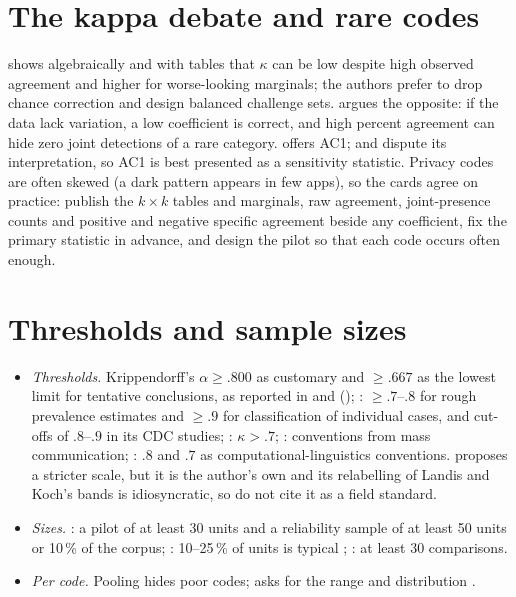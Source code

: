 \section{The kappa debate and rare codes}
 shows algebraically and with tables that $\kappa$ can be low despite high observed agreement and higher for worse-looking marginals; the authors prefer to drop chance correction and design balanced challenge sets.  argues the opposite: if the data lack variation, a low coefficient is correct, and high percent agreement can hide zero joint detections of a rare category.  offers AC1;  and  dispute its interpretation, so AC1 is best presented as a sensitivity statistic. Privacy codes are often skewed (a dark pattern appears in few apps), so the cards agree on practice: publish the $k\times k$ tables and marginals, raw agreement, joint-presence counts and positive and negative specific agreement beside any coefficient, fix the primary statistic in advance, and design the pilot so that each code occurs often enough.

\section{Thresholds and sample sizes}
\begin{itemize}
\item \emph{Thresholds.} Krippendorff's $\alpha\ge.800$ as customary and $\ge.667$ as the lowest limit for tentative conclusions, as reported in  and  (); : $\ge.7$--$.8$ for rough prevalence estimates and $\ge.9$ for classification of individual cases, and cut-offs of $.8$--$.9$ in its CDC studies; : $\kappa>.7$; : conventions from mass communication; : $.8$ and $.7$ as computational-linguistics conventions.  proposes a stricter scale, but it is the author's own and its relabelling of Landis and Koch's bands is idiosyncratic, so do not cite it as a field standard.
\item \emph{Sizes.} : a pilot of at least 30 units and a reliability sample of at least 50 units or 10\,\% of the corpus; : 10--25\,\% of units is typical ; : at least 30 comparisons.
\item \emph{Per code.} Pooling hides poor codes;  asks for the range and distribution .
\end{itemize}

